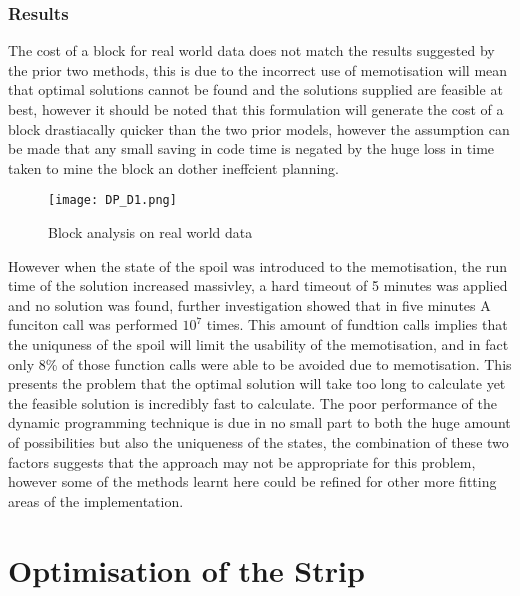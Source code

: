 \subsubsection{Results}
The cost of a block for real world data does not match the results suggested by the prior two methods, this is due to the incorrect use of memotisation will mean that optimal solutions cannot be found and the solutions supplied are feasible at best, however it should be noted that this formulation will generate the cost of a block drastiacally quicker than the two prior models, however the assumption can be made that any small saving in code time is negated by the huge loss in time taken to mine the block an dother ineffcient planning. 
\begin{figure}[h]
\caption{Block analysis on real world data }
\label{DP1}
\texttt{[image: DP\_D1.png]}
\end{figure}
However when the state of the spoil was introduced to the memotisation, the run time of the solution increased massivley, a hard timeout of 5 minutes was applied and no solution was found, further investigation showed that in five minutes A funciton call was performed $10^7$ times. This amount of fundtion calls implies that the uniquness of the spoil will limit the usability of the memotisation, and in fact only 8\% of those function calls were able to be avoided due to memotisation. This presents the problem that the optimal solution will take too long to calculate yet the feasible solution is incredibly fast to calculate. The poor performance of the dynamic programming technique is due in no small part to both the huge amount of possibilities but also the uniqueness of the states, the combination of these two factors suggests that the approach may not be appropriate for this problem, however some of the methods learnt here could be refined for other more fitting areas of the implementation.  

\section{Optimisation of the Strip}
